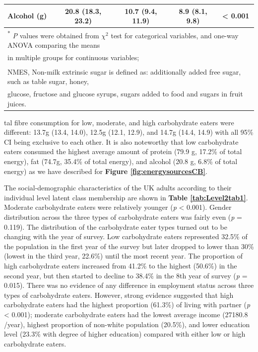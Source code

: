\begin{table}[H]
\begin{tabular}[t]{lcccc}
		Alcohol (g) & 20.8 (18.3, 23.2) & 10.7 (9.4, 11.9) & 8.9 (8.1, 9.8) & < 0.001\\
		\bottomrule
		\multicolumn{5}{l}{{\scriptsize \textsuperscript{*} \textit{P} values were obtained from $\chi^2$ test for categorical variables, and one-way ANOVA comparing the means}}\\
		\multicolumn{5}{l}{{\scriptsize  in multiple groups for continuous variables;}}\\
		\multicolumn{5}{l}{{\scriptsize \textsuperscript{\dag} NMES, Non-milk extrinsic sugar is defined as: additionally added free sugar, such as table sugar, honey, }}\\
		\multicolumn{5}{l}{{\scriptsize glucose, fructose and glucose syrups, sugars added to food and sugars in fruit juices.}}\\
	\end{tabular}
\end{table}


tal fibre consumption for low, moderate, and high carbohydrate eaters were different: 13.7g (13.4, 14.0), 12.5g (12.1, 12.9), and 14.7g (14.4, 14.9) with all 95\% CI being exclusive to each other. It is also noteworthy that low carbohydrate eaters consumed the highest average amount of protein (79.9 g, 17.2\% of total energy), fat (74.7g, 35.4\% of total energy), and alcohol (20.8 g, 6.8\% of total energy) as we have described for \textbf{Figure \ref{fig:energysourcesCB}}. 
 
The social-demographic characteristics of the UK adults according to their individual level latent class membership are shown in \textbf{Table \ref{tab:Level2tab1}}. Moderate carbohydrate eaters were relatively younger (\textit{p} < 0.001). Gender distribution across the three types of carbohydrate eaters was fairly even (\textit{p} = 0.119). The distribution of the carbohydrate eater types turned out to be changing with the year of survey. Low carbohydrate eaters represented 32.5\% of the population in the first year of the survey but later dropped to lower than 30\% (lowest in the third year, 22.6\%) until the most recent year. The proportion of high carbohydrate eaters increased from 41.2\% to the highest (50.6\%) in the second year, but then started to decline to 38.4\% in the 8th year of survey (\textit{p} = 0.015). There was no evidence of any difference in employment status across three types of carbohydrate eaters. However, strong evidence suggested that high carbohydrate eaters had the highest proportion (61.3\%) of living with partner (\textit{p} < 0.001); moderate carbohydrate eaters had the lowest average income (27180.8 \textsterling/year), highest proportion of non-white population (20.5\%), and lower education level (23.3\% with degree of higher education) compared with either low or high carbohydrate eaters. 


